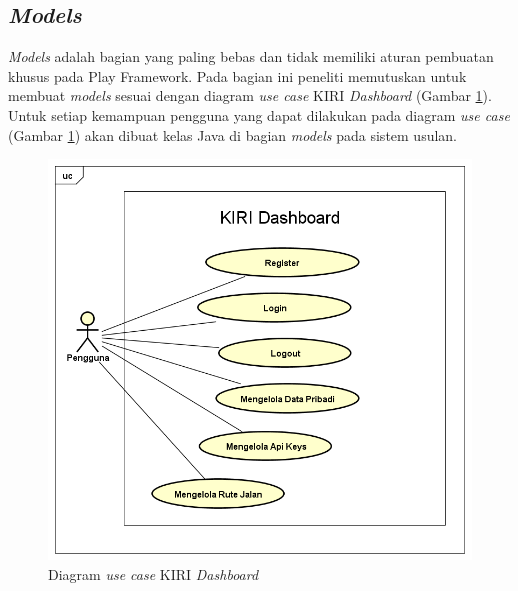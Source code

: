 \subsection{\textit{Models}}
\label{sec:modelusulan}
\textit{Models} adalah bagian yang paling bebas dan tidak memiliki aturan pembuatan khusus pada Play Framework. Pada bagian ini peneliti memutuskan untuk membuat \textit{models} sesuai dengan diagram \textit{use case} KIRI \textit{Dashboard} (Gambar \ref{fig:3_usecase}). Untuk setiap kemampuan pengguna yang dapat dilakukan pada diagram \textit{use case} (Gambar \ref{fig:3_usecase}) akan dibuat kelas Java di bagian \textit{models} pada sistem usulan.

\begin{figure}[htbp]
	\centering
		\includegraphics[scale=0.5]{Gambar/3_usecase.png}
	\caption{Diagram \textit{use case} KIRI \textit{Dashboard}}
	\label{fig:3_usecase}
\end{figure}

